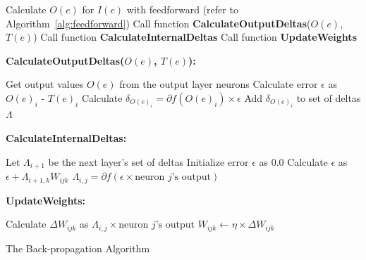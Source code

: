 \documentclass[11pt]{article}
\begin{document}
\begin{algorithm}%
\dontprintsemicolon
{}

\SetLine
{}
{
	Calculate $O(e)$ for $I(e)$ with feedforward (refer to Algorithm~\ref{alg:feedforward})\;
	Call function \textbf{CalculateOutputDeltas}($O(e)$, $T(e)$)\;
	Call function \textbf{CalculateInternalDeltas}\;
	Call function \textbf{UpdateWeights}\;
}

\textbf{CalculateOutputDeltas($O(e)$, $T(e)$):}

Get output values $O(e)$ from the output layer neurons\;
{
	Calculate error $\epsilon$ as $O(e)_i$ - $T(e)_i$\;
	Calculate \textbf{$\delta_{O(e)_{i}} = \partial{f(O(e)_{i})}  \times \epsilon $}\;
	Add $\delta_{O(e)_{i}}$ to set of deltas $\Lambda$
}  

\textbf{CalculateInternalDeltas:}

Let $\Lambda_{i+1}$ be the next layer's set of deltas\;
{
	{
	Initialize error $\epsilon$ as $0.0$\;
		{
			Calculate $\epsilon$ as $\epsilon + \Lambda_{i+1,k} W_{ijk}$\;
		}
		$\Lambda_{i,j} = \partial{f( \epsilon \times \mbox{neuron } j\mbox{'s output} )}$\;
	}
} 

\textbf{UpdateWeights:}

{
	{
		{
			Calculate $\Delta W_{ijk}$ as $\Lambda_{i,j} \times \mbox{neuron } j\mbox{'s output}$\;
			$W_{ijk} \leftarrow \eta \times \Delta{W_{ijk}}   $\;
		}
	}
} 

\caption{The Back-propagation Algorithm }
\label{alg:backpropagation}
\end{algorithm}
\end{document}
